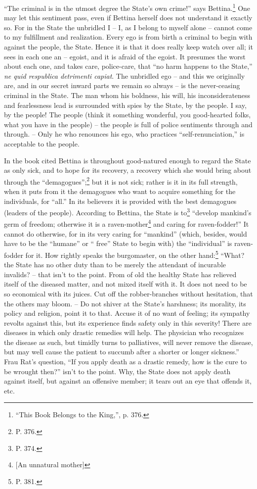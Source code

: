 ``The criminal is in the utmost degree the State's own crime!'' says 
Bettina.\footnote{``This Book Belongs to the King,'', p. 376.} One may let 
this sentiment pass, even if Bettina herself does not understand it exactly 
so. For in the State the unbridled I -- I, as I belong to myself alone -- 
cannot come to my fulfillment and realization. Every ego is from birth a 
criminal to begin with against the people, the State. Hence it is that it does 
really keep watch over all; it sees in each one an -- egoist, and it is afraid 
of the egoist. It presumes the worst about each one, and takes care, 
police-care, that ``no harm happens to the State,'' \textit{ne quid 
respublica detrimenti capiat}. The unbridled ego -- and this we originally 
are, and in our secret inward parts we remain so always -- is the 
never-ceasing criminal in the State. The man whom his boldness, his will, his 
inconsiderateness and fearlessness lead is surrounded with spies by the State, 
by the people. I say, by the people! The people (think it something wonderful, 
you good-hearted folks, what you have in the people) -- the people is full of 
police sentiments through and through. -- Only he who renounces his ego, who 
practices ``self-renunciation,'' is acceptable to the people.

In the book cited Bettina is throughout good-natured enough to regard the 
State as only sick, and to hope for its recovery, a recovery which she would 
bring about through the ``demagogues'';\footnote{P. 376.} but it is not 
sick; rather is it in its full strength, when it puts from it the demagogues 
who want to acquire something for the individuals, for ``all.'' In its 
believers it is provided with the best demagogues (leaders of the people). 
According to Bettina, the State is to\footnote{P. 374.} ``develop mankind's 
germ of freedom; otherwise it is a raven-mother\footnote{[An unnatural 
mother]} and caring for raven-fodder!'' It cannot do otherwise, for in its 
very caring for ``mankind'' (which, besides, would have to be the 
``humane'' or `` free'' State to begin with) the ``individual'' is 
raven-fodder for it. How rightly speaks the burgomaster, on the other 
hand:\footnote{P. 381.} ``What? the State has no other duty than to be merely 
the attendant of incurable invalids? -- that isn't to the point. From of old 
the healthy State has relieved itself of the diseased matter, and not mixed 
itself with it. It does not need to be so economical with its juices. Cut off 
the robber-branches without hesitation, that the others may bloom. -- Do not 
shiver at the State's harshness; its morality, its policy and religion, point 
it to that. Accuse it of no want of feeling; its sympathy revolts against 
this, but its experience finds safety only in this severity! There are 
diseases in which only drastic remedies will help. The physician who 
recognizes the disease as such, but timidly turns to palliatives, will never 
remove the disease, but may well cause the patient to succumb after a shorter 
or longer sickness.'' Frau Rat's question, ``If you apply death as a drastic 
remedy, how is the cure to be wrought then?'' isn't to the point. Why, the 
State does not apply death against itself, but against an offensive member; it 
tears out an eye that offends it, etc.

